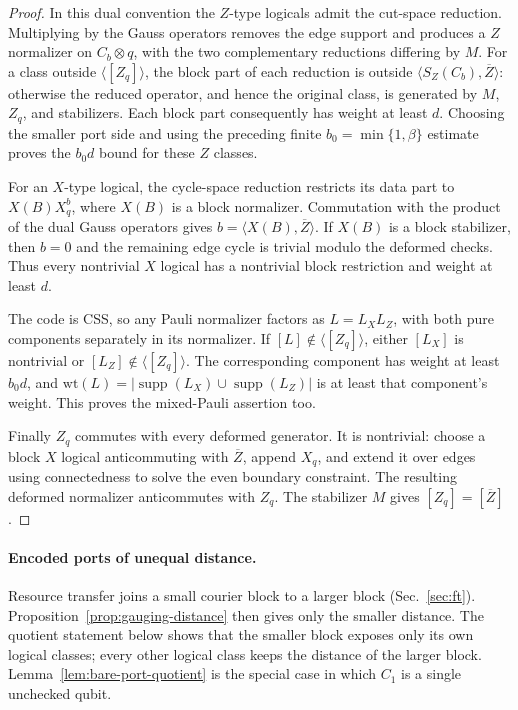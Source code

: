 \documentclass[aps,prx,reprint,superscriptaddress,nofootinbib,floatfix,longbibliography]{revtex4-2}
\theoremstyle{definition}
\begin{document}
\begin{proof}
In this dual convention the $Z$-type logicals admit the cut-space reduction. Multiplying by the Gauss operators removes the edge support and produces a $Z$ normalizer on $C_b\otimes q$, with the two complementary reductions differing by $M$. For a class outside $\langle[Z_q]\rangle$, the block part of each reduction is outside $\langle S_Z(C_b),\overline Z\rangle$: otherwise the reduced operator, and hence the original class, is generated by $M$, $Z_q$, and stabilizers. Each block part consequently has weight at least $d$. Choosing the smaller port side and using the preceding finite $b_0=\min\{1,\beta\}$ estimate proves the $b_0d$ bound for these $Z$ classes.

For an $X$-type logical, the cycle-space reduction restricts its data part to $X(B)X_q^b$, where $X(B)$ is a block normalizer. Commutation with the product of the dual Gauss operators gives $b=\langle X(B),\overline Z\rangle$. If $X(B)$ is a block stabilizer, then $b=0$ and the remaining edge cycle is trivial modulo the deformed checks. Thus every nontrivial $X$ logical has a nontrivial block restriction and weight at least $d$.

The code is CSS, so any Pauli normalizer factors as $L=L_XL_Z$, with both pure components separately in its normalizer. If $[L]\notin\langle[Z_q]\rangle$, either $[L_X]$ is nontrivial or $[L_Z]\notin\langle[Z_q]\rangle$. The corresponding component has weight at least $b_0d$, and $\mathrm{wt}(L)=|\operatorname{supp}(L_X)\cup\operatorname{supp}(L_Z)|$ is at least that component's weight. This proves the mixed-Pauli assertion too.

Finally $Z_q$ commutes with every deformed generator. It is nontrivial: choose a block $X$ logical anticommuting with $\overline Z$, append $X_q$, and extend it over edges using connectedness to solve the even boundary constraint. The resulting deformed normalizer anticommutes with $Z_q$. The stabilizer $M$ gives $[Z_q]=[\overline Z]$.
\end{proof}

\paragraph{Encoded ports of unequal distance.}
Resource transfer joins a small courier block to a larger block
(Sec.~\ref{sec:ft}).  Proposition~\ref{prop:gauging-distance} then gives only
the smaller distance.  The quotient statement below shows that the smaller
block exposes only its own logical classes; every other logical class keeps
the distance of the larger block.  Lemma~\ref{lem:bare-port-quotient} is the
special case in which $C_1$ is a single unchecked qubit.
\end{document}
